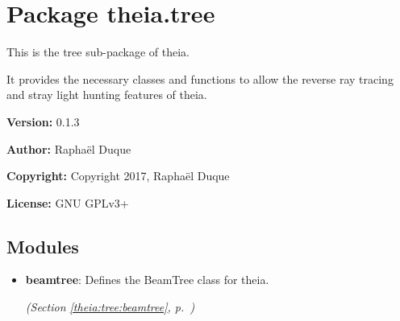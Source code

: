 %
%
%


\section{Package theia.tree}

    \label{theia:tree}
This is the tree sub-package of theia.

It provides the necessary classes and functions to allow the reverse ray 
tracing and stray light hunting features of theia.

\textbf{Version:} 0.1.3



\textbf{Author:} Raphaël Duque



\textbf{Copyright:} Copyright 2017, Raphaël Duque



\textbf{License:} GNU GPLv3+





\subsection{Modules}

\begin{itemize}
\setlength{\parskip}{0ex}
\item \textbf{beamtree}: Defines the BeamTree class for theia.



  \textit{(Section \ref{theia:tree:beamtree}, p.~\pageref{theia:tree:beamtree})}

\end{itemize}

